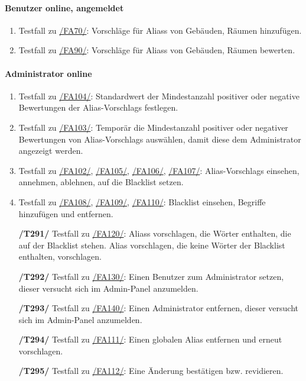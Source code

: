 \paragraph{\Gls{Benutzer} online, angemeldet}
\begin{enumerate}[label=\textbf{/T\arabic*0/}, align=left, resume]
	\item \label{/T240/} Testfall zu \hyperref[/FA70/]{/FA70/}: Vorschläge für \Glspl{Alias} von Gebäuden, Räumen hinzufügen.
	\item \label{/T250/} Testfall zu \hyperref[/FA90/]{/FA90/}: Vorschläge für \Glspl{Alias} von Gebäuden, Räumen bewerten.
\end{enumerate}

\paragraph{\Gls{Administrator} online}
\begin{enumerate}[label=\textbf{/T\arabic*0/}, align=left, resume]
	\item \label{/T260/} Testfall zu \hyperref[/FA104/]{/FA104/}: Standardwert der Mindestanzahl positiver oder negative Bewertungen der \Glspl{Alias-Vorschlag} festlegen.
	\item \label{/T270/} Testfall zu \hyperref[/FA103/]{/FA103/}: Temporär die Mindestanzahl positiver oder negativer Bewertungen von \Glspl{Alias-Vorschlag} auswählen, damit diese dem \Gls{Administrator} angezeigt werden.
	\item \label{/T280/} Testfall zu \hyperref[/FA102/]{/FA102/}, \hyperref[/FA105/]{/FA105/}, \hyperref[/FA106/]{/FA106/}, \hyperref[/FA107/]{/FA107/}: \Glspl{Alias-Vorschlag} einsehen, annehmen, ablehnen, auf die \Gls{Blacklist} setzen.
	\item \label{/T290/} Testfall zu \hyperref[/FA108/]{/FA108/}, \hyperref[/FA109/]{/FA109/}, \hyperref[/FA110/]{/FA110/}: \Gls{Blacklist} einsehen, Begriffe hinzufügen und entfernen.
	\item[\textbf{/T291/}] \label{/T291/} Testfall zu \hyperref[/FA120/]{/FA120/}: \Glspl{Alias} vorschlagen, die Wörter enthalten, die auf der \Gls{Blacklist} stehen. \Gls{Alias} vorschlagen, die keine Wörter der \Gls{Blacklist} enthalten, vorschlagen.
	\item[\textbf{/T292/}] \label{/T292/} Testfall zu \hyperref[/FA130/]{/FA130/}: Einen \Gls{Benutzer} zum \Gls{Administrator} setzen, dieser versucht sich im \Gls{Admin-Panel} anzumelden.
	\item[\textbf{/T293/}] \label{/T293/} Testfall zu \hyperref[/FA140/]{/FA140/}: Einen \Gls{Administrator} entfernen, dieser versucht sich im \Gls{Admin-Panel} anzumelden.
	\item[\textbf{/T294/}] \label{/T294/} Testfall zu \hyperref[/FA111/]{/FA111/}: Einen \gls{global}en \Gls{Alias} entfernen und erneut vorschlagen.
	\item[\textbf{/T295/}] \label{/T295/} Testfall zu \hyperref[/FA112/]{/FA112/}: Eine Änderung bestätigen bzw. revidieren.
\end{enumerate}

